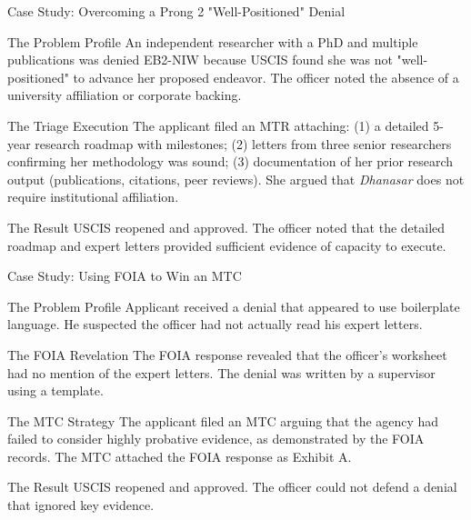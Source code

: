 \documentclass[11pt]{beamer}
\begin{document}
	\begin{frame}{Case Study: Overcoming a Prong 2 "Well-Positioned" Denial}
		\scriptsize
		\begin{block}{The Problem Profile}
			An independent researcher with a PhD and multiple publications was denied EB2-NIW because USCIS found she was not "well-positioned" to advance her proposed endeavor. The officer noted the absence of a university affiliation or corporate backing.
		\end{block}
		\begin{block}{The Triage Execution}
			The applicant filed an MTR attaching: (1) a detailed 5-year research roadmap with milestones; (2) letters from three senior researchers confirming her methodology was sound; (3) documentation of her prior research output (publications, citations, peer reviews). She argued that \textit{Dhanasar} does not require institutional affiliation.
		\end{block}
		\begin{block}{The Result}
			USCIS reopened and approved. The officer noted that the detailed roadmap and expert letters provided sufficient evidence of capacity to execute.
		\end{block}
	\end{frame}
	
	\begin{frame}{Case Study: Using FOIA to Win an MTC}
		\scriptsize
		\begin{block}{The Problem Profile}
			Applicant received a denial that appeared to use boilerplate language. He suspected the officer had not actually read his expert letters.
		\end{block}
		\begin{block}{The FOIA Revelation}
			The FOIA response revealed that the officer's worksheet had no mention of the expert letters. The denial was written by a supervisor using a template.
		\end{block}
		\begin{block}{The MTC Strategy}
			The applicant filed an MTC arguing that the agency had failed to consider highly probative evidence, as demonstrated by the FOIA records. The MTC attached the FOIA response as Exhibit A.
		\end{block}
		\begin{block}{The Result}
			USCIS reopened and approved. The officer could not defend a denial that ignored key evidence.
		\end{block}
	\end{frame}
	
\end{document}
